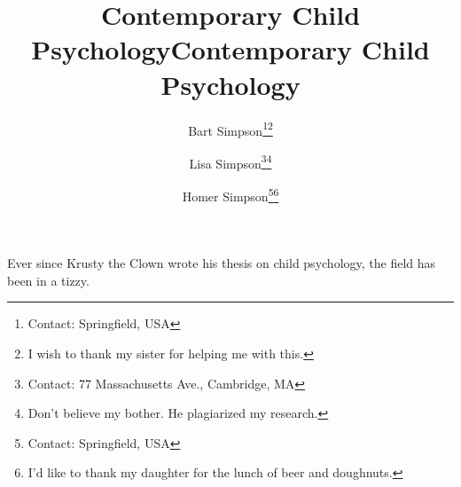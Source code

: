 \documentclass[]{memoir}
\begin{document}
\author{Bart Simpson\thanks{Contact: Springfield, USA}\thanks{I wish to thank my sister for helping me with this.}}
\title{Contemporary Child Psychology}
\begin{titlingpage}

\global\let\tmpclearpage\clearpage %
\global\let\clearpage\relax %

\maketitle

\emptythanks %
\end{titlingpage}
\global\let\clearpage\tmpclearpage %

\author{Lisa Simpson\thanks{Contact: 77 Massachusetts Ave., Cambridge, MA}\thanks{Don't believe my bother. He plagiarized my research.}}

\title{Contemporary Child Psychology}
\begin{titlingpage}
\maketitle
\emptythanks %
\end{titlingpage}

\emptythanks
\author{Homer Simpson\thanks{Contact: Springfield, USA}\thanks{I'd like to thank my daughter for the lunch of beer and doughnuts.}}
\maketitle

Ever since Krusty the Clown wrote his thesis on child psychology, the field has been in a tizzy.
\end{document}
